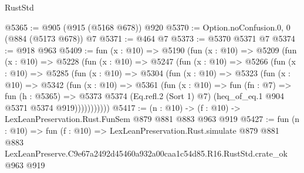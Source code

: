 \begin{lexlean}{RustStd}
\begin{coremodule}
@5365 := @905 (@915 (@5168 @678)) @920
@5370 := Option.noConfusion.{0, 0} (@884 (@5173 @678)) @7
@5371 := @464 @7
@5373 := @5370 @5371 @7
@5374 := @918 @963
@5409 := fun (x : @10) =>
  @5190
    (fun (x : @10) =>
    @5209
      (fun (x : @10) =>
      @5228
        (fun (x : @10) =>
        @5247
          (fun (x : @10) =>
          @5266
            (fun (x : @10) =>
            @5285
              (fun (x : @10) =>
              @5304
                (fun (x : @10) =>
                @5323
                  (fun (x : @10) =>
                  @5342
                    (fun (x : @10) =>
                    @5361
                      (fun (x : @10) =>
                      fun (fn : @7) =>
                      fun (h : @5365) =>
                      @5373
                        @5374
                        (Eq.refl.{2} (Sort 1) @7)
                        (heq_of_eq.{1} @904 @5371 @5374 @919)))))))))))
@5417 := (n : @10) -> (f : @10) -> LexLeanPreservation.Rust.FunSem @879 @881 @883 @963 @919
@5427 := fun (n : @10) =>
  fun (f : @10) =>
  LexLeanPreservation.Rust.simulate
    @879
    @881
    @883
    LexLeanPreserve.C9e67a2492d45460a932a00caa1c54d85.R16.RustStd.crate_ok
    @963
    @919
\end{coremodule}
\end{lexlean}

